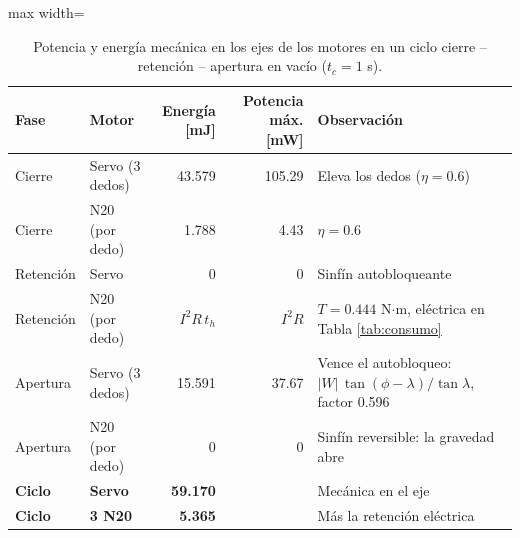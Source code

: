 \begin{table}[H]
\centering

\begin{adjustbox}{max width=\textwidth}
\begin{tabular}{|l|l|r|r|l|}
\hline
\textbf{Fase} & \textbf{Motor} & \textbf{Energía [mJ]} & \textbf{Potencia máx. [mW]} & \textbf{Observación} \\ \hline
Cierre & Servo (3 dedos) & 43.579 & 105.29 & Eleva los dedos ($\eta = 0.6$) \\ \hline
Cierre & N20 (por dedo) & 1.788 & 4.43 & $\eta = 0.6$ \\ \hline
Retención & Servo & 0 & 0 & Sinfín autobloqueante \\ \hline
Retención & N20 (por dedo) & $I^2 R\,t_h$ & $I^2R$ & $T = 0.444$ N$\cdot$m, eléctrica en Tabla \ref{tab:consumo} \\ \hline
Apertura & Servo (3 dedos) & 15.591 & 37.67 & Vence el autobloqueo: $|W|\,\tan(\phi-\lambda)/\tan\lambda$, factor 0.596 \\ \hline
Apertura & N20 (por dedo) & 0 & 0 & Sinfín reversible: la gravedad abre \\ \hline
\textbf{Ciclo} & \textbf{Servo} & \textbf{59.170} &  & Mecánica en el eje \\ \hline
\textbf{Ciclo} & \textbf{3 N20} & \textbf{5.365} &  & Más la retención eléctrica \\ \hline
\end{tabular}
\end{adjustbox}
\caption{Potencia y energía mecánica en los ejes de los motores en un ciclo cierre -- retención -- apertura en vacío ($t_c = 1$ s).}
\label{tab:ciclo}
\end{table}